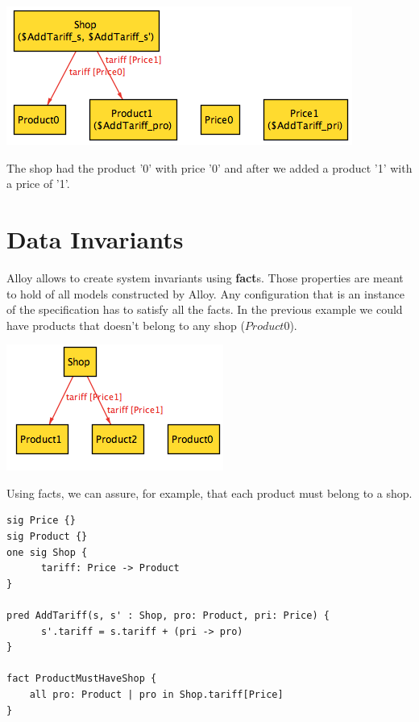 \documentclass[oneside]{book}
\begin{document}
\begin{center}
\includegraphics[scale=0.6]{shop3}
\end{center}

The shop had the product '0' with price '0' and after we added a product '1' with a price of '1'.

\newpage

\section{Data Invariants}

Alloy allows to create system invariants using \textbf{fact}s. Those properties are meant to hold of all models constructed by Alloy. Any configuration that is an instance of the specification has to satisfy all the facts. In the previous example we could have products that doesn't belong to any shop ($Product0$).

\begin{center}
\includegraphics[scale=0.6]{shop4}
\end{center}

Using facts, we can assure, for example, that each product must belong to a shop.

\begin{lstlisting}
sig Price {}
sig Product {}
one sig Shop {
	  tariff: Price -> Product
}

pred AddTariff(s, s' : Shop, pro: Product, pri: Price) {
	  s'.tariff = s.tariff + (pri -> pro)
}

fact ProductMustHaveShop {
	all pro: Product | pro in Shop.tariff[Price]
}
\end{lstlisting}
\end{document}
